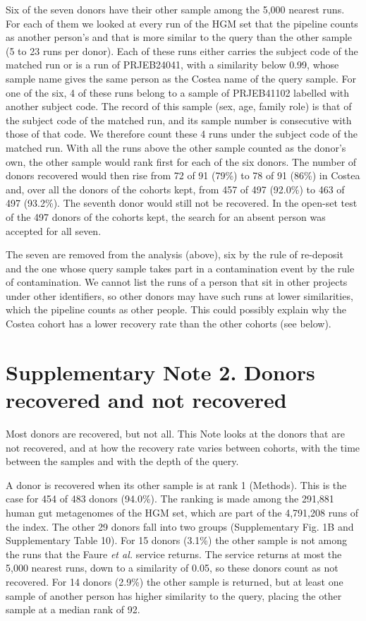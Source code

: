 \documentclass[11pt,a4paper]{article}
\begin{document}
Six of the seven donors have their other sample among the 5,000 nearest runs. For each of them we looked at every run of the HGM set that the pipeline counts as another person's and that is more similar to the query than the other sample (5 to 23 runs per donor). Each of these runs either carries the subject code of the matched run or is a run of PRJEB24041, with a similarity below 0.99, whose sample name gives the same person as the Costea name of the query sample. For one of the six, 4 of these runs belong to a sample of PRJEB41102 labelled with another subject code. The record of this sample (sex, age, family role) is that of the subject code of the matched run, and its sample number is consecutive with those of that code. We therefore count these 4 runs under the subject code of the matched run. With all the runs above the other sample counted as the donor's own, the other sample would rank first for each of the six donors. The number of donors recovered would then rise from 72 of 91 (79\%) to 78 of 91 (86\%) in Costea and, over all the donors of the cohorts kept, from 457 of 497 (92.0\%) to 463 of 497 (93.2\%). The seventh donor would still not be recovered. In the open-set test of the 497 donors of the cohorts kept, the search for an absent person was accepted for all seven.

The seven are removed from the analysis (above), six by the rule of re-deposit and the one whose query sample takes part in a contamination event by the rule of contamination. We cannot list the runs of a person that sit in other projects under other identifiers, so other donors may have such runs at lower similarities, which the pipeline counts as other people. This could possibly explain why the Costea cohort has a lower recovery rate than the other cohorts (see below).

\FloatBarrier
\section*{Supplementary Note 2. Donors recovered and not recovered}

Most donors are recovered, but not all. This Note looks at the donors that are not recovered, and at how the recovery rate varies between cohorts, with the time between the samples and with the depth of the query.

A donor is recovered when its other sample is at rank 1 (Methods). This is the case for 454 of 483 donors (94.0\%). The ranking is made among the 291,881 human gut metagenomes of the HGM set, which are part of the 4,791,208 runs of the index. The other 29 donors fall into two groups (Supplementary Fig. 1B and Supplementary Table 10). For 15 donors (3.1\%) the other sample is not among the runs that the Faure \textit{et al.} service returns. The service returns at most the 5,000 nearest runs, down to a similarity of 0.05, so these donors count as not recovered. For 14 donors (2.9\%) the other sample is returned, but at least one sample of another person has higher similarity to the query, placing the other sample at a median rank of 92.
\end{document}
